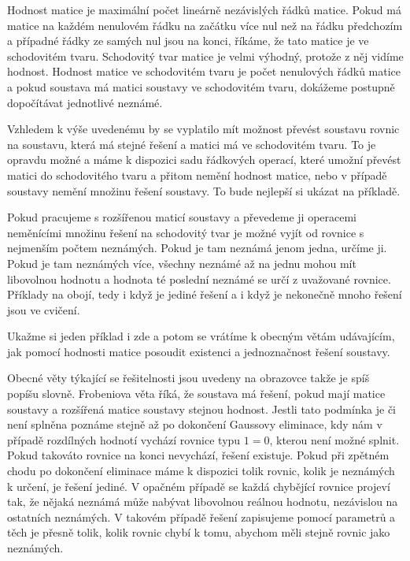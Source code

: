 \documentclass[12pt]{article}
\begin{document}
Hodnost matice je maximální počet lineárně nezávislých řádků matice. Pokud má matice na každém nenulovém řádku na začátku více nul než na řádku předchozím a případné řádky ze samých nul jsou na konci, říkáme, že tato matice je ve schodovitém tvaru. Schodovitý tvar matice je velmi výhodný, protože z něj vidíme hodnost. Hodnost matice ve schodovitém tvaru je počet nenulových řádků matice a pokud soustava má matici soustavy ve schodovitém tvaru, dokážeme postupně dopočítávat jednotlivé neznámé. 

Vzhledem k výše uvedenému by se vyplatilo mít možnost převést soustavu rovnic na soustavu, která má stejné řešení a matici má ve schodovitém tvaru. To je opravdu možné a máme k dispozici sadu řádkových operací, které umožní převést matici do schodovitého tvaru a přitom nemění hodnost matice, nebo v případě soustavy nemění množinu řešení soustavy. To bude nejlepší si ukázat na příkladě.

Pokud pracujeme s rozšířenou maticí soustavy a převedeme ji operacemi neměnícími množinu řešení na schodovitý tvar je možné vyjít od rovnice s nejmenším počtem neznámých. Pokud je tam neznámá jenom jedna, určíme ji. Pokud je tam neznámých více, všechny neznámé až na jednu mohou mít libovolnou hodnotu a hodnota té poslední neznámé se určí z uvažované rovnice. Příklady na obojí, tedy i když je jediné řešení a i když je nekonečně mnoho řešení jsou ve cvičení. 

Ukažme si jeden příklad i zde a potom se vrátíme k obecným větám udávajícím, jak pomocí hodnosti matice posoudit existenci a jednoznačnost řešení soustavy.



Obecné věty týkající se řešitelnosti jsou uvedeny na obrazovce takže je spíš popíšu slovně. Frobeniova věta říká, že soustava má řešení, pokud mají matice soustavy a rozšířená matice soustavy stejnou hodnost. Jestli tato podmínka je či není splněna poznáme stejně až po dokončení Gaussovy eliminace, kdy nám v případě rozdílných hodnotí vychází rovnice typu $1=0$, kterou není možné splnit. Pokud takováto rovnice na konci nevychází, řešení existuje. Pokud při zpětném chodu po dokončení eliminace máme k dispozici tolik rovnic, kolik je neznámých k určení, je řešení jediné. V opačném případě se každá chybějící rovnice projeví tak, že nějaká neznámá může nabývat libovolnou reálnou hodnotu, nezávislou na ostatních neznámých. V takovém případě řešení zapisujeme pomocí parametrů a těch je přesně tolik, kolik rovnic chybí k tomu, abychom měli stejně rovnic jako neznámých.
\end{document}
